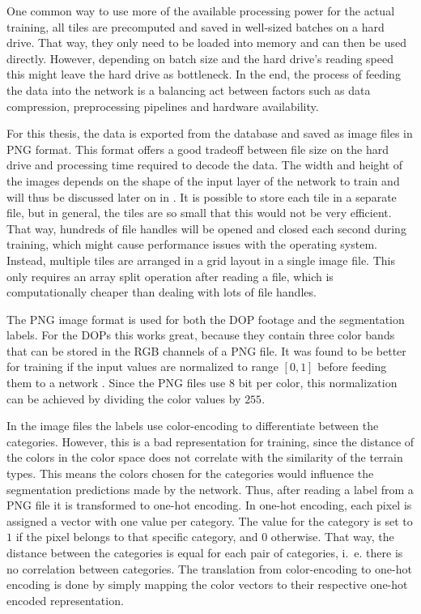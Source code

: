 One common way to use more of the available processing power for the actual training, all tiles are precomputed and saved in well-sized batches on a hard drive. That way, they only need to be loaded into memory and can then be used directly. However, depending on batch size and the hard drive's reading speed this might leave the hard drive as bottleneck. In the end, the process of feeding the data into the network is a balancing act between factors such as data compression, preprocessing pipelines and hardware availability.

For this thesis, the data is exported from the database and saved as image files in PNG format. This format offers a good tradeoff between file size on the hard drive and processing time required to decode the data. The width and height of the images depends on the shape of the input layer of the network to train and will thus be discussed later on in . It is possible to store each tile in a separate file, but in general, the tiles are so small that this would not be very efficient. That way, hundreds of file handles will be opened and closed each second during training, which might cause performance issues with the operating system. Instead, multiple tiles are arranged in a grid layout in a single image file. This only requires an array split operation after reading a file, which is computationally cheaper than dealing with lots of file handles.

The PNG image format is used for both the DOP footage and the segmentation labels. For the DOPs this works great, because they contain three color bands that can be stored in the RGB channels of a PNG file. It was found to be better for training if the input values are normalized to range $[0, 1]$ before feeding them to a network . Since the PNG files use 8 bit per color, this normalization can be achieved by dividing the color values by $255$.

In the image files the labels use color-encoding to differentiate between the categories. However, this is a bad representation for training, since the distance of the colors in the color space does not correlate with the similarity of the terrain types. This means the colors chosen for the categories would influence the segmentation predictions made by the network. Thus, after reading a label from a PNG file it is transformed to one-hot encoding. In one-hot encoding, each pixel is assigned a vector with one value per category. The value for the category is set to $1$ if the pixel belongs to that specific category, and $0$ otherwise. That way, the distance between the categories is equal for each pair of categories, i.~e. there is no correlation between categories. The translation from color-encoding to one-hot encoding is done by simply mapping the color vectors to their respective one-hot encoded representation.

